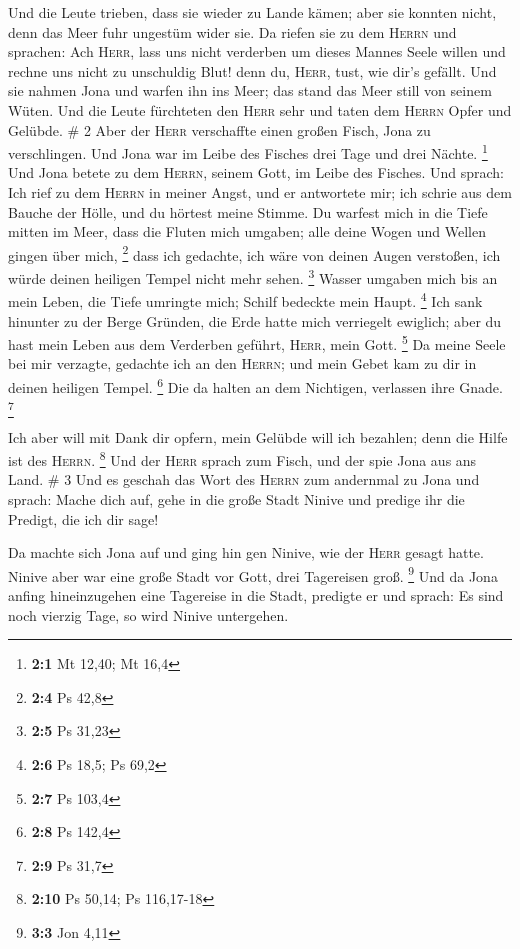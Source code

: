  Und die Leute trieben, dass sie wieder zu Lande kämen;
aber sie konnten nicht, denn das Meer fuhr ungestüm wider sie.
 Da riefen sie zu dem \textsc{Herrn} und sprachen: Ach
\textsc{Herr}, lass uns nicht verderben um dieses Mannes Seele willen
und rechne uns nicht zu unschuldig Blut! denn du, \textsc{Herr}, tust,
wie dir's gefällt.  Und sie nahmen Jona und warfen ihn
ins Meer; das stand das Meer still von seinem Wüten.  Und
die Leute fürchteten den \textsc{Herr} sehr und taten dem \textsc{Herrn}
Opfer und Gelübde. \# 2  Aber der \textsc{Herr}
verschaffte einen großen Fisch, Jona zu verschlingen. Und Jona war im
Leibe des Fisches drei Tage und drei Nächte. \footnote{\textbf{2:1} Mt
  12,40; Mt 16,4}  Und Jona betete zu dem \textsc{Herrn},
seinem Gott, im Leibe des Fisches.  Und sprach: Ich rief
zu dem \textsc{Herrn} in meiner Angst, und er antwortete mir; ich schrie
aus dem Bauche der Hölle, und du hörtest meine Stimme.  Du
warfest mich in die Tiefe mitten im Meer, dass die Fluten mich umgaben;
alle deine Wogen und Wellen gingen über mich, \footnote{\textbf{2:4} Ps
  42,8}  dass ich gedachte, ich wäre von deinen Augen
verstoßen, ich würde deinen heiligen Tempel nicht mehr sehen.
\footnote{\textbf{2:5} Ps 31,23}  Wasser umgaben mich bis
an mein Leben, die Tiefe umringte mich; Schilf bedeckte mein Haupt.
\footnote{\textbf{2:6} Ps 18,5; Ps 69,2}  Ich sank
hinunter zu der Berge Gründen, die Erde hatte mich verriegelt ewiglich;
aber du hast mein Leben aus dem Verderben geführt, \textsc{Herr}, mein
Gott. \footnote{\textbf{2:7} Ps 103,4}  Da meine Seele bei
mir verzagte, gedachte ich an den \textsc{Herrn}; und mein Gebet kam zu
dir in deinen heiligen Tempel. \footnote{\textbf{2:8} Ps 142,4}
 Die da halten an dem Nichtigen, verlassen ihre Gnade.
\footnote{\textbf{2:9} Ps 31,7}

 Ich aber will mit Dank dir opfern, mein Gelübde will ich
bezahlen; denn die Hilfe ist des \textsc{Herrn}. \footnote{\textbf{2:10}
  Ps 50,14; Ps 116,17-18}  Und der \textsc{Herr} sprach
zum Fisch, und der spie Jona aus ans Land. \# 3  Und es
geschah das Wort des \textsc{Herrn} zum andernmal zu Jona und sprach:
 Mache dich auf, gehe in die große Stadt Ninive und
predige ihr die Predigt, die ich dir sage!

 Da machte sich Jona auf und ging hin gen Ninive, wie der
\textsc{Herr} gesagt hatte. Ninive aber war eine große Stadt vor Gott,
drei Tagereisen groß. \footnote{\textbf{3:3} Jon 4,11} 
Und da Jona anfing hineinzugehen eine Tagereise in die Stadt, predigte
er und sprach: Es sind noch vierzig Tage, so wird Ninive untergehen.

